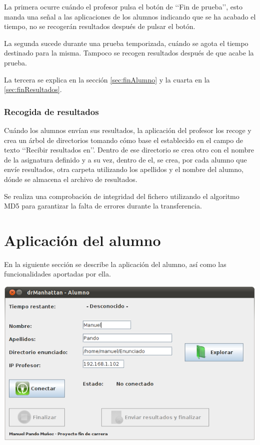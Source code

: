 \documentclass[11pt]{article}
\begin{document}
La primera ocurre cuándo el profesor pulsa el botón de \lq\lq Fin de prueba\rq\rq, esto manda una señal a las aplicaciones de los alumnos indicando que se ha acabado el tiempo, no se recogerán resultados después de pulsar el botón.

La segunda sucede durante una prueba temporizada, cuándo se agota el tiempo destinado para la misma. Tampoco se recogen resultados después de que acabe la prueba.

La tercera se explica en la sección \ref{sec:finAlumno} y la cuarta en la \ref{sec:finResultados}.

\subsubsection{Recogida de resultados}

Cuándo los alumnos envían sus resultados, la aplicación del profesor los recoge y crea un árbol de directorios tomando cómo base el establecido en el campo de texto \lq\lq Recibir resultados en\rq\rq. Dentro de ese directorio se crea otro con el nombre de la asignatura definido y a su vez, dentro de el, se crea, por cada alumno que envíe resultados, otra carpeta utilizando los apellidos y el nombre del alumno, dónde se almacena el archivo de resultados.

Se realiza una comprobación de integridad del fichero utilizando el algoritmo MD5 para garantizar la falta de errores durante la transferencia.

\newpage
\section{Aplicación del alumno}

En la siguiente sección se describe la aplicación del alumno, así como las funcionalidades aportadas por ella.

\begin{center}
    \includegraphics[width=.90\linewidth]{imagenes/GUIAlumno}
\end{center}
\end{document}
